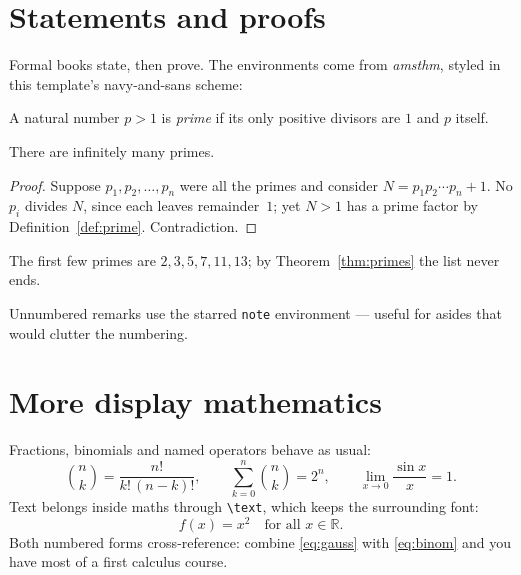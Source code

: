 \section{Statements and proofs}
Formal books state, then prove. The environments come from
\emph{amsthm}, styled in this template's navy-and-sans scheme:

\begin{definition}\label{def:prime}
A natural number $p > 1$ is \emph{prime} if its only positive
divisors are $1$ and $p$ itself.
\end{definition}

\begin{theorem}[Euclid]\label{thm:primes}
There are infinitely many primes.
\end{theorem}

\begin{proof}
Suppose $p_1, p_2, \dots, p_n$ were all the primes and consider
$N = p_1 p_2 \cdots p_n + 1$. No $p_i$ divides $N$, since each
leaves remainder~$1$; yet $N > 1$ has a prime factor by
Definition~\ref{def:prime}. Contradiction.
\end{proof}

\begin{example}
The first few primes are $2, 3, 5, 7, 11, 13$;
by Theorem~\ref{thm:primes} the list never ends.
\end{example}

\begin{note}
Unnumbered remarks use the starred \texttt{note} environment ---
useful for asides that would clutter the numbering.
\end{note}

\section{More display mathematics}
Fractions, binomials and named operators behave as usual:
\begin{equation}\label{eq:binom}
  \binom{n}{k} = \frac{n!}{k!\,(n-k)!},
  \qquad \sum_{k=0}^{n} \binom{n}{k} = 2^{n},
  \qquad \lim_{x \to 0} \frac{\sin x}{x} = 1.
\end{equation}
Text belongs inside maths through \texttt{\textbackslash text},
which keeps the surrounding font:
\begin{equation*}
  f(x) = x^{2} \quad \text{for all } x \in \mathbb{R}.
\end{equation*}
Both numbered forms cross-reference: combine
\eqref{eq:gauss} with \eqref{eq:binom} and you have most of a
first calculus course.

